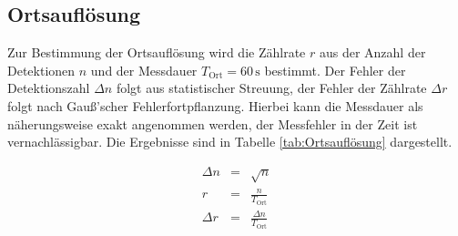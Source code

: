 \documentclass[12pt,a4paper]{scrartcl}
\numberwithin{equation}{section} %
\begin{document}
\hypertarget{auswertung-ortsaufluxf6sung}{\subsection{Ortsauflösung}\label{auswertung-ortsaufluxf6sung}}
Zur Bestimmung der Ortsauflösung wird die Zählrate $r$ aus der Anzahl der Detektionen $n$ und der Messdauer $T_\mathrm{Ort}=60\,\mathrm{s}$ bestimmt. Der Fehler der Detektionszahl $\Delta n$ folgt aus statistischer Streuung, der Fehler der Zählrate $\Delta r$ folgt nach Gauß'scher Fehlerfortpflanzung. Hierbei kann die Messdauer als näherungsweise exakt angenommen werden, der Messfehler in der Zeit ist vernachlässigbar. Die Ergebnisse sind in Tabelle \ref{tab:Ortsauflösung} dargestellt.

\begin{eqnarray}
	\Delta n &=& \sqrt{n} \label{eq:Delta n} \\
	r &=& \frac{n}{T_\mathrm{Ort}} \label{eq:Zählrate} \\
	\Delta r &=& \frac{\Delta n}{T_\mathrm{Ort}} \label{eq:ZählrateFehler}
\end{eqnarray}
\end{document}
